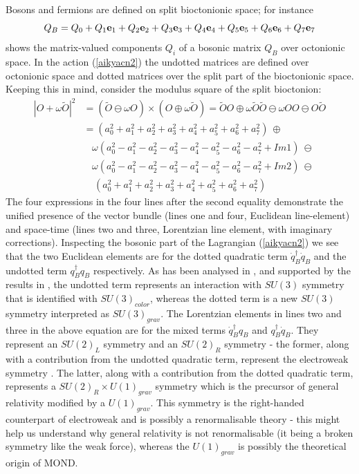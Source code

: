 \documentclass[a4paper]{jpconf}
\begin{document}
Bosons and fermions are defined on split bioctonionic space; for instance
\begin{equation}
Q_B = Q_0 + Q_1 {\bf e}_1 + Q_2 {\bf e}_2 + Q_3 {\bf e}_3 + Q_4 {\bf e}_4 + Q_5 {\bf e}_5 + Q_6 {\bf e}_6 + Q_7 {\bf e}_7
\end{equation}
shows the matrix-valued components $Q_i$ of a bosonic matrix $Q_B$ over octonionic space. In the action (\ref{aikyacn2}) the undotted matrices are defined over octonionic space and dotted matrices over the split part of the bioctonionic space. Keeping this in mind, consider the modulus square of the split bioctonion:
\begin{equation}
\begin{split}
|O + \omega \tilde{O}|^2 & = (\tilde O \ominus \omega O) \times (O \oplus  \omega \tilde O) = \tilde{O}O \oplus \omega \tilde O \tilde O \ominus  \omega O O \ominus O \tilde O   \\
& =  (a_0^2 + a_1^2 + a_2^2 + a_3^2 + a_4^2 + a_5^2 + a_6^2 + a_7^2)\  \oplus \\
&\ \ \ \   \omega (a_0^2 - a_1^2 - a_2^2 - a_3^2 - a_4^2 - a_5^2 - a_6^2 - a_7^2 +Im1) \ \ominus \\
& \ \ \ \ \omega (a_0^2 - a_1^2 - a_2^2 - a_3^2 - a_4^2 - a_5^2 - a_6^2 - a_7^2 + Im2)\  \ominus  \\
&\ \ \ \   \   (a_0^2 + a_1^2 + a_2^2 + a_3^2 + a_4^2 + a_5^2 + a_6^2 +a_7^2) 
\end{split}
\label{thirteen}
\end{equation}
The four expressions in the four lines after the second equality demonstrate the unified presence of the vector bundle (lines one and four, Euclidean line-element) and space-time (lines two and three, Lorentzian line element, with imaginary corrections). Inspecting the bosonic part of the Lagrangian (\ref{aikyacn2}) we see that the two Euclidean elements are for the dotted quadratic term $\dot{q}_B^\dagger \dot{q}_B$ and the undotted term ${q}_B^\dagger q_{B}$ respectively. As has been analysed in \cite{Raj}, and supported by the results in \cite{Kaushik}, the undotted term represents an interaction with $SU(3)$ symmetry that is identified with $SU(3)_{color}$, whereas the dotted term is a new $SU(3)$ symmetry interpreted as $SU(3)_{grav}$. The Lorentzian elements in lines two and three in the above equation are for the mixed terms $\dot{q}_B^\dagger q_B$ and ${q}_B^\dagger  \dot{q}_B$. They represent an $SU(2)_L$ symmetry and an $SU(2)_R$ symmetry - the former, along with a contribution from the undotted quadratic term, represent the electroweak symmetry \cite{Raj, Kaushik}. The latter, along with a contribution from the dotted quadratic term, represents a $SU(2)_R \times U(1)_{grav}$ symmetry which is the  precursor of general relativity modified by a $U(1)_{grav}$. This symmetry is the right-handed counterpart of electroweak and is possibly a renormalisable theory - this might help us understand why general relativity is not renormalisable (it being a broken symmetry like the  weak force), whereas the $U(1)_{grav}$ is possibly the theoretical origin of MOND.
\end{document}

